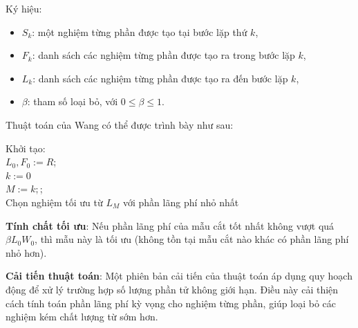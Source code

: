 \documentclass[a4paper]{article}
\begin{document}
Ký hiệu:
\begin{itemize}
    \item \( S_k \): một nghiệm từng phần được tạo tại bước lặp thứ \( k \),
    \item \( F_k \): danh sách các nghiệm từng phần được tạo ra trong bước lặp \( k \),
    \item \( L_k \): danh sách các nghiệm từng phần được tạo ra đến bước lặp \( k \),
    \item \( \beta \): tham số loại bỏ, với \( 0 \leq \beta \leq 1 \).
\end{itemize}

Thuật toán của Wang có thể được trình bày như sau:
\begin{algorithm}[H]
\caption{Thuật toán Wang}
Khởi tạo: \\
          \( L_0, F_0 := R \);\\
          \( k := 0 \)\; \\
\(M := k;\); \\
Chọn nghiệm tối ưu từ \( L_M \) với phần lãng phí nhỏ nhất\;
\end{algorithm}

\hspace{11pt}
\textbf{Tính chất tối ưu}: Nếu phần lãng phí của mẫu cắt tốt nhất không vượt quá \( \beta L_0 W_0 \), thì mẫu này là tối ưu (không tồn tại mẫu cắt nào khác có phần lãng phí nhỏ hơn).


\hspace{11pt}
\textbf{Cải tiến thuật toán}: Một phiên bản cải tiến của thuật toán áp dụng quy hoạch động để xử lý trường hợp số lượng phần tử không giới hạn. Điều này cải thiện cách tính toán phần lãng phí kỳ vọng cho nghiệm từng phần, giúp loại bỏ các nghiệm kém chất lượng từ sớm hơn.
\end{document}
